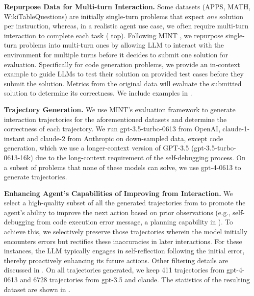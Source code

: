 \noindent \textbf{Repurpose Data for Multi-turn Interaction.}
Some datasets (APPS, MATH, WikiTableQuestions) are initially single-turn problems that expect \textit{one} solution per instruction, whereas, in a realistic agent use case, we often require multi-turn interaction to complete each task ( top).
% 
Following MINT \citep{wang2023mint}, we repurpose single-turn problems into multi-turn ones by allowing LLM to interact with the environment for multiple turns before it decides to submit one solution for evaluation.
% 
Specifically for code generation problems, we provide an in-context example to guide LLMs to test their solution on provided test cases before they submit the solution.
% 
Metrics from the original data will evaluate the submitted solution to determine its correctness. We include examples in .



\noindent \textbf{Trajectory Generation.}
% 
We use MINT's evaluation framework \citep{wang2023mint} to generate interaction trajectories for the aforementioned datasets and determine the correctness of each trajectory.
We run gpt-3.5-turbo-0613 from OpenAI, claude-1-instant and claude-2 from Anthropic on down-sampled data, except code generation, which we use a longer-context version of GPT-3.5 (gpt-3.5-turbo-0613-16k) due to the long-context requirement of the self-debugging process.
% 
On a subset of problems that none of these models can solve, we use gpt-4-0613 to generate trajectories.


\noindent \textbf{Enhancing Agent's Capabilities of Improving from Interaction.}
\label{sec:agent_env_data_self_improve}
% 
We select a high-quality subset of all the generated trajectories from \dataname to promote the agent's ability to improve the next action based on prior observations (e.g., self-debugging from code execution error message, a planning capability in ).
% 
To achieve this, we selectively preserve those trajectories wherein the model initially encounters errors but rectifies these inaccuracies in later interactions.
% 
For these instances, the LLM typically engages in self-reflection following the initial error, thereby proactively enhancing its future actions. 
% 
Other filtering details are discussed in .
% 
On all trajectories generated, we keep 411 trajectories from gpt-4-0613 and 6728 trajectories from gpt-3.5 and claude. 
The statistics of the resulting dataset \dataname are shown in .

